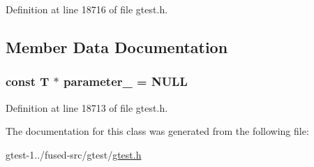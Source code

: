 \-Definition at line 18716 of file gtest.\-h.



\subsection{\-Member \-Data \-Documentation}
\hypertarget{classtesting_1_1WithParamInterface_a2e61fb23c84a146a99fafc9247201db5}{
\subsubsection[{parameter\-\_\-}]{\setlength{\rightskip}{0pt plus 5cm}const \-T $\ast$ {\bf parameter\-\_\-} = \-N\-U\-L\-L}}\label{d5/d86/classtesting_1_1WithParamInterface_a2e61fb23c84a146a99fafc9247201db5}


\-Definition at line 18713 of file gtest.\-h.



\-The documentation for this class was generated from the following file\-:\begin{DoxyCompactItemize}
\item 
gtest-\/1../fused-\/src/gtest/\hyperlink{fused-src_2gtest_2gtest_8h}{gtest.\-h}\end{DoxyCompactItemize}
